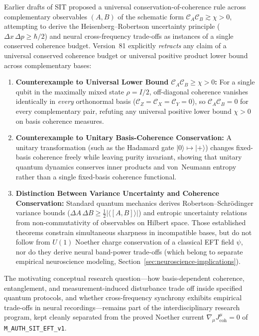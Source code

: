 Earlier drafts of SIT proposed a universal conservation-of-coherence rule across complementary observables $(A, B)$ of the schematic form $\mathcal{C}_A \mathcal{C}_B \gtrsim \chi > 0$, attempting to derive the Heisenberg--Robertson uncertainty principle ($\Delta x\,\Delta p \ge \hbar/2$) and neural cross-frequency trade-offs as instances of a single conserved coherence budget. Version~81 explicitly \emph{retracts} any claim of a universal conserved coherence budget or universal positive product lower bound across complementary bases:
\begin{enumerate}[leftmargin=2em]
  \item \textbf{Counterexample to Universal Lower Bound $\mathcal{C}_A \mathcal{C}_B \ge \chi > 0$:} For a single qubit in the maximally mixed state $\rho = I/2$, off-diagonal coherence vanishes identically in \emph{every} orthonormal basis ($\mathcal{C}_Z = \mathcal{C}_X = \mathcal{C}_Y = 0$), so $\mathcal{C}_A \mathcal{C}_B = 0$ for every complementary pair, refuting any universal positive lower bound $\chi > 0$ on basis coherence measures.
  \item \textbf{Counterexample to Unitary Basis-Coherence Conservation:} A unitary transformation (such as the Hadamard gate $|0\rangle \mapsto |+\rangle$) changes fixed-basis coherence freely while leaving purity invariant, showing that unitary quantum dynamics conserves inner products and von~Neumann entropy rather than a single fixed-basis coherence functional.
  \item \textbf{Distinction Between Variance Uncertainty and Coherence Conservation:} Standard quantum mechanics derives Robertson--Schr\"odinger variance bounds ($\Delta A\,\Delta B \ge \frac{1}{2}|\langle[A,B]\rangle|$) and entropic uncertainty relations from non-commutativity of observables on Hilbert space. Those established theorems constrain simultaneous sharpness in incompatible bases, but do not follow from $U(1)$ Noether charge conservation of a classical EFT field $\psi$, nor do they derive neural band-power trade-offs (which belong to separate empirical neuroscience modeling, Section~\ref{sec:neuroscience-implications}).
\end{enumerate}

The motivating conceptual research question---how basis-dependent coherence, entanglement, and measurement-induced disturbance trade off inside specified quantum protocols, and whether cross-frequency synchrony exhibits empirical trade-offs in neural recordings---remains part of the interdisciplinary research program, kept cleanly separated from the proved Noether current $\nabla_\mu J^\mu_{\mathrm{coh}} = 0$ of \texttt{M\_AUTH\_SIT\_EFT\_v1}.

